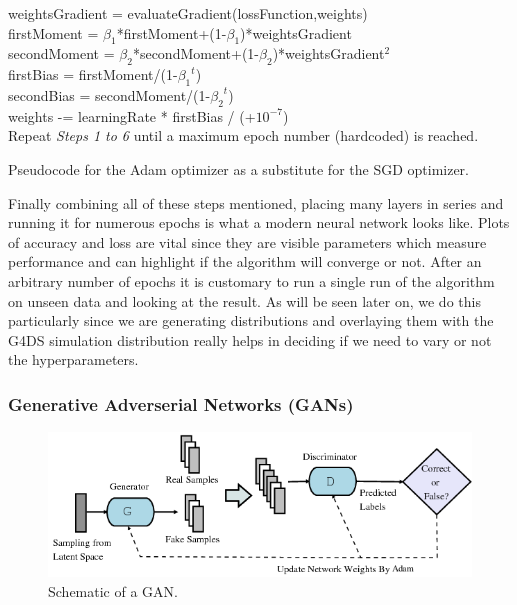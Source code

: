 \documentclass[11pt]{article} %
\begin{document}
\begin{algorithm}
weightsGradient = evaluateGradient(lossFunction,weights)\\
firstMoment = ${\beta_1}$*firstMoment+(1-${\beta_1}$)*weightsGradient\\
secondMoment = ${\beta_2}$*secondMoment+(1-${\beta_2}$)*weightsGradient$^2$\\
firstBias = firstMoment/(1-${{\beta_1}^t}$)\\
secondBias = secondMoment/(1-${{\beta_2}^t}$)\\
weights -= learningRate * firstBias / (+${10^{-7}}$) \\
Repeat \textit{Steps 1 to 6} until a maximum epoch number (hardcoded) is reached.
\caption{Pseudocode for the Adam optimizer as a substitute for the SGD optimizer.}
\label{algo:adam}
\end{algorithm}

Finally combining all of these steps mentioned, placing many layers in series and running it for numerous epochs is what a modern neural network looks like. Plots of accuracy and loss are vital since they are visible parameters which measure performance and can highlight if the algorithm will converge or not. After an arbitrary number of epochs it is customary to run a single run of the algorithm on unseen data and looking at the result. As will be seen later on, we do this particularly since we are generating distributions and overlaying them with the G4DS simulation distribution really helps in deciding if we need to vary or not the hyperparameters.

\subsubsection{Generative Adverserial Networks (GANs)}
\begin{figure}[H]
\centering
\includegraphics[scale=0.7]{images/gans.png}
\caption{\cite{Plakias2018GenerativeAN} Schematic of a GAN.}
\label{fig:gan_schematic}
\end{figure}
\end{document}

